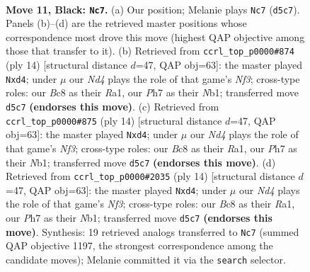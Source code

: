 \documentclass[11pt]{article}
\begin{document}
\clearpage

\begin{figure}[p]\centering
\begin{subfigure}{0.46\textwidth}\centering
\resizebox{\linewidth}{!}{%
\newchessgame
\chessboard[
  setfen={1rbq1rk1/pp3pbp/2n3p1/2pnp3/7P/3PPNP1/PP3PB1/RNBQ1RK1 b - - 0 11},
  showmover=false,
  pgfstyle=straightmove, color=movearrow, markmove={d5-c7}
]}
\caption{}
\end{subfigure}\hfill
\begin{subfigure}{0.46\textwidth}\centering
\resizebox{\linewidth}{!}{%
\newchessgame
\chessboard[
  setfen={rnbq1rk1/pp2ppbp/5np1/3P4/3p4/5NP1/PP2PPBP/RNBQ1RK1 w - - 0 8},
  showmover=false,
  pgfstyle=straightmove, color=movearrow, markmove={f3-d4}
]}
\caption{}
\end{subfigure}
\\[4pt]
\begin{subfigure}{0.46\textwidth}\centering
\resizebox{\linewidth}{!}{%
\newchessgame
\chessboard[
  setfen={rnbq1rk1/pp2ppbp/5np1/3P4/3p4/5NP1/PP2PPBP/RNBQ1RK1 w - - 0 8},
  showmover=false,
  pgfstyle=straightmove, color=movearrow, markmove={f3-d4}
]}
\caption{}
\end{subfigure}\hfill
\begin{subfigure}{0.46\textwidth}\centering
\resizebox{\linewidth}{!}{%
\newchessgame
\chessboard[
  setfen={rnbq1rk1/pp2ppbp/5np1/3P4/3p4/5NP1/PP2PPBP/RNBQ1RK1 w - - 0 8},
  showmover=false,
  pgfstyle=straightmove, color=movearrow, markmove={f3-d4}
]}
\caption{}
\end{subfigure}
\caption{\textbf{Move 11, Black: \texttt{Nc7}.} (a) Our position; Melanie plays \texttt{Nc7} (\texttt{d5c7}). Panels (b)--(d) are the retrieved master positions whose correspondence most drove this move (highest QAP objective among those that transfer to it). (b) Retrieved from \texttt{ccrl\_top\_p0000\#874} (ply 14) [structural distance $d$=47, QAP obj=63]: the master played \texttt{Nxd4}; under $\mu$ our \emph{Nd4} plays the role of that game's \emph{Nf3}; cross-type roles: our \emph{B}c8 as their \emph{R}a1, our \emph{P}h7 as their \emph{N}b1; transferred move \texttt{d5c7} \textbf{(endorses this move)}. (c) Retrieved from \texttt{ccrl\_top\_p0000\#875} (ply 14) [structural distance $d$=47, QAP obj=63]: the master played \texttt{Nxd4}; under $\mu$ our \emph{Nd4} plays the role of that game's \emph{Nf3}; cross-type roles: our \emph{B}c8 as their \emph{R}a1, our \emph{P}h7 as their \emph{N}b1; transferred move \texttt{d5c7} \textbf{(endorses this move)}. (d) Retrieved from \texttt{ccrl\_top\_p0000\#2035} (ply 14) [structural distance $d$=47, QAP obj=63]: the master played \texttt{Nxd4}; under $\mu$ our \emph{Nd4} plays the role of that game's \emph{Nf3}; cross-type roles: our \emph{B}c8 as their \emph{R}a1, our \emph{P}h7 as their \emph{N}b1; transferred move \texttt{d5c7} \textbf{(endorses this move)}. Synthesis: 19 retrieved analogs transferred to \texttt{Nc7} (summed QAP objective 1197, the strongest correspondence among the candidate moves); Melanie committed it via the \texttt{search} selector.}
\label{fig:thought-m21}
\end{figure}
\end{document}
